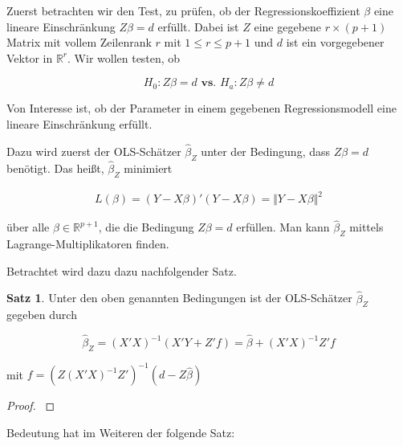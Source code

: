 \documentclass[12pt,a4paper]{article}
\theoremstyle{definition}
\theoremstyle{definition}
\newtheorem{Satz}[Definition]{Satz}
\theoremstyle{definition}
\theoremstyle{definition}
\begin{document}
Zuerst betrachten wir den Test, zu prüfen, ob der Regressionskoeffizient $\beta$ eine lineare Einschränkung $Z \beta = d$ erfüllt. Dabei ist $Z$ eine gegebene $r \times (p+1)$ Matrix mit vollem Zeilenrank $r$ mit $1 \leq r \leq p+1$ und $d$ ist ein vorgegebener Vektor in $\mathbb{R}^r$. Wir wollen testen, ob

\begin{equation}
H_{0} : Z \beta = d  \textbf{ vs. }  H_{a} : Z \beta \neq d \label{Einschränkung_Hypothese}
\end{equation}

Von Interesse ist, ob der Parameter in einem gegebenen Regressionsmodell eine lineare Einschränkung erfüllt.

Dazu wird zuerst der OLS-Schätzer $\hat{\beta}_Z$ unter der Bedingung, dass $Z \beta = d$ benötigt. Das heißt, $\hat{\beta}_Z$ minimiert

\begin{align*}
L(\beta) = (Y-X\beta)'(Y-X\beta) = \Vert Y - X \beta \Vert^2
\end{align*}

über alle $\beta \in \mathbb{R}^{p+1}$, die die Bedingung $Z \beta = d$ erfüllen. Man kann $\hat{\beta}_Z$ mittels Lagrange-Multiplikatoren finden. 

Betrachtet wird dazu dazu nachfolgender Satz.

\begin{Satz}
Unter den oben genannten Bedingungen ist der OLS-Schätzer $\hat{\beta}_Z$ gegeben durch 

\begin{equation*}
\hat{\beta}_Z=(X'X)^{-1}(X'Y+Z'f)= \hat{\beta}+(X'X)^{-1}Z'f
\end{equation*}

mit $f=(Z(X'X)^{-1}Z')^{-1}(d-Z\hat{\beta})$
\end{Satz}

\begin{proof}
\cite[13]{Liu64}
\end{proof}

Bedeutung hat im Weiteren der folgende Satz:
\end{document}
